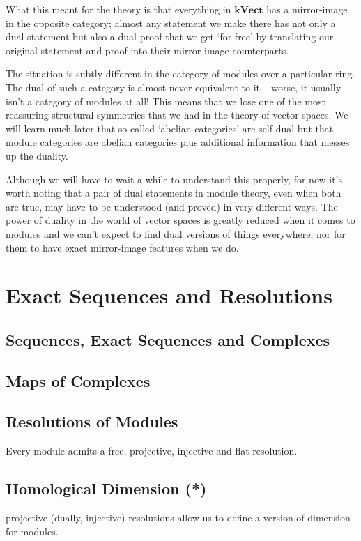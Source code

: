 \documentclass[oneside,english]{amsbook}
\numberwithin{section}{chapter}
\theoremstyle{plain}
\theoremstyle{definition}
\newcommand{\kVect}{\mathbf{k}\mathbf{Vect}}
\begin{document}
			What this meant for the theory is that everything in $\kVect$ has a mirror-image in the opposite category; almost any statement we make there has not only a dual statement but also a dual proof that we get `for free' by translating our original statement and proof into their mirror-image counterparts.
			
			The situation is subtly different in the category of modules over a particular ring. The dual of such a category is almost never equivalent to it -- worse, it usually isn't a category of modules at all! This means that we lose one of the most reassuring structural symmetries that we had in the theory of vector spaces. We will learn much later that so-called `abelian categories' are self-dual but that module categories are abelian categories plus additional information that messes up the duality. 
			
			Although we will have to wait a while to understand this properly, for now it's worth noting that a pair of dual statements in module theory, even when both are true, may have to be understood (and proved) in very different ways. The power of duality in the world of vector spaces is greatly reduced when it comes to modules and we can't expect to find dual versions of things everywhere, nor for them to have exact mirror-image features when we do.

	\chapter{Exact Sequences and Resolutions}
		
		\section{Sequences, Exact Sequences and Complexes}
		\section{Maps of Complexes}
			
		\section{Resolutions of Modules}
			Every module admits a free, projective, injective and flat resolution. 
			
		\section{Homological Dimension (*)}
			projective (dually, injective) resolutions allow us to define a version of dimension for modules. 
\end{document}
